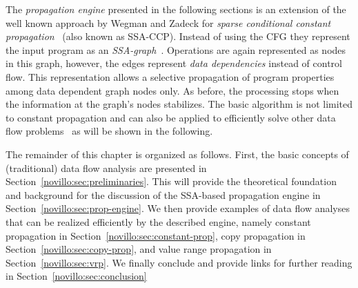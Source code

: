 The \emph{propagation engine} presented in the following sections is an
extension of the well known approach by Wegman and Zadeck for \emph{sparse
conditional constant propagation}~\cite{bib:wegman.ea-91} (also known as
SSA-CCP). Instead of using the CFG they represent the input program as an
\emph{SSA-graph}~\cite{novillo:bib:CFRWZ91}. Operations are again represented as
nodes in this graph, however, the edges represent \emph{data dependencies}
instead of control flow. This representation allows a selective propagation of
program properties among data dependent graph nodes only. As before, the
processing stops when the information at the graph's nodes stabilizes. The basic
algorithm is not limited to constant propagation and can also be applied to
efficiently solve other data flow problems~\cite{novillo:bib:N05} as will be
shown in the following.

The remainder of this chapter is organized as follows. First, the basic concepts
of (traditional) data flow analysis are presented in
Section~\ref{novillo:sec:preliminaries}. This will provide the theoretical
foundation and background for the discussion of the SSA-based propagation
engine in Section~\ref{novillo:sec:prop-engine}. We then provide examples of
data flow analyses that can be realized efficiently by the described engine,
namely constant propagation in Section~\ref{novillo:sec:constant-prop}, copy
propagation in Section~\ref{novillo:sec:copy-prop}, and value range propagation
in Section~\ref{novillo:sec:vrp}. We finally conclude and provide links for
further reading in Section~\ref{novillo:sec:conclusion}

